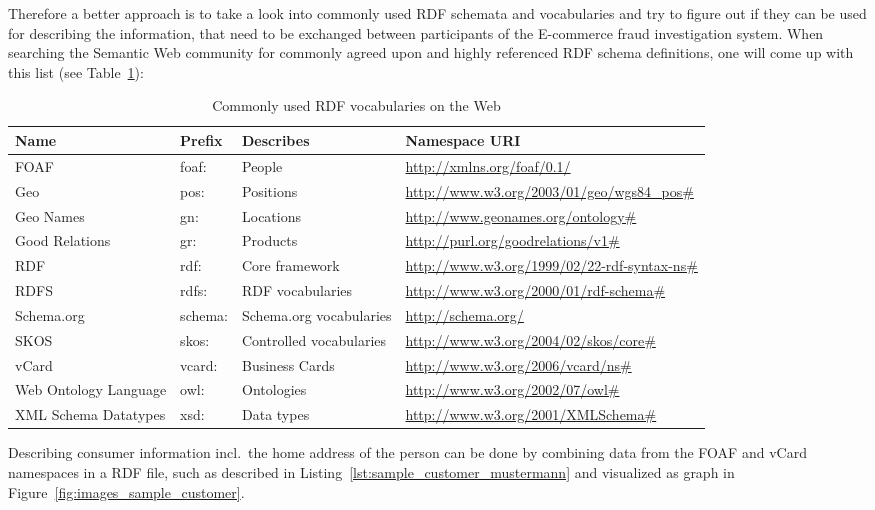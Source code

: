 Therefore a better approach is to take a look into commonly used \gls{RDF} schemata and vocabularies and try to figure out if they can be used for describing the information, that need to be exchanged between participants of the \gls{E-commerce} fraud investigation system. When searching the Semantic Web community for commonly agreed upon and highly referenced \gls{RDF} schema definitions, one will come up with this list (see Table~\ref{tab:used_vocab_rdf}):\@

\begin{table}[H]
\centering
\begin{tabular}{p{3cm}llp{4.5cm}}
\hline
\multicolumn{1}{l}{\textbf{Name}} & \multicolumn{1}{l}{\textbf{Prefix}} & \multicolumn{1}{l}{\textbf{Describes}} & \multicolumn{1}{l}{\textbf{Namespace URI}} \\
\hline
FOAF & foaf: & People & \url{http://xmlns.org/foaf/0.1/} \\
\hline
Geo & pos: & Positions & \url{http://www.w3.org/2003/01/geo/wgs84\_pos\#} \\
\hline
Geo Names & gn: & Locations & \url{http://www.geonames.org/ontology\#} \\
\hline
Good Relations & gr: & Products & \url{http://purl.org/goodrelations/v1\#} \\
\hline
RDF & rdf: & Core framework & \url{http://www.w3.org/1999/02/22-rdf-syntax-ns\#} \\
\hline
RDFS & rdfs: & RDF vocabularies & \url{http://www.w3.org/2000/01/rdf-schema\#} \\
\hline
Schema.org & schema: & Schema.org vocabularies & \url{http://schema.org/} \\
\hline
SKOS & skos: & Controlled vocabularies & \url{http://www.w3.org/2004/02/skos/core\#} \\
\hline
vCard & vcard: & Business Cards & \url{http://www.w3.org/2006/vcard/ns\#} \\
\hline
Web Ontology Language & owl: & Ontologies & \url{http://www.w3.org/2002/07/owl\#} \\
\hline
XML Schema Datatypes & xsd: & Data types & \url{http://www.w3.org/2001/XMLSchema\#} \\
\hline
\end{tabular}
\caption{Commonly used \gls{RDF} vocabularies on the Web \citep[pg. 41]{wood2014linked}}
\label{tab:used_vocab_rdf}
\end{table}

Describing consumer information incl.\ the home address of the person can be done by combining data from the \gls{FOAF} and \gls{vCard} namespaces in a \gls{RDF} file, such as described in Listing~\ref{lst:sample_customer_mustermann} and visualized as graph in Figure~\ref{fig:images_sample_customer}. \@

